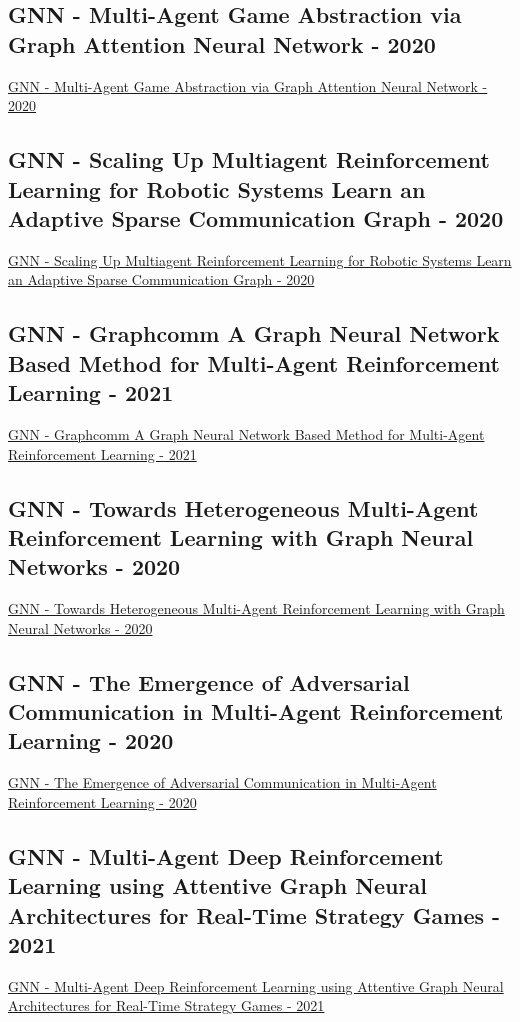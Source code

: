 \subsection{GNN - Multi-Agent Game Abstraction via Graph Attention Neural Network  - 2020}
\href{https://ojs.aaai.org/index.php/AAAI/article/view/6211}{GNN - Multi-Agent Game Abstraction via Graph Attention Neural Network  - 2020}

\subsection{GNN - Scaling Up Multiagent Reinforcement Learning for Robotic Systems Learn an Adaptive Sparse Communication Graph - 2020}
\href{https://arxiv.org/abs/2003.01040}{GNN - Scaling Up Multiagent Reinforcement Learning for Robotic Systems Learn an Adaptive Sparse Communication Graph - 2020}

\subsection{GNN - Graphcomm A Graph Neural Network Based Method for Multi-Agent Reinforcement Learning - 2021}
\href{https://ieeexplore.ieee.org/abstract/document/9413716}{GNN - Graphcomm A Graph Neural Network Based Method for Multi-Agent Reinforcement Learning - 2021}

\subsection{GNN - Towards Heterogeneous Multi-Agent Reinforcement Learning with Graph Neural Networks - 2020}
\href{https://arxiv.org/abs/2009.13161}{GNN - Towards Heterogeneous Multi-Agent Reinforcement Learning with Graph Neural Networks - 2020}

\subsection{GNN - The Emergence of Adversarial Communication in Multi-Agent Reinforcement Learning - 2020}
\href{https://arxiv.org/abs/2008.02616}{GNN - The Emergence of Adversarial Communication in Multi-Agent Reinforcement Learning - 2020}

\subsection{GNN - Multi-Agent Deep Reinforcement Learning using Attentive Graph Neural Architectures for Real-Time Strategy Games - 2021}
\href{https://arxiv.org/abs/2105.10211}{GNN - Multi-Agent Deep Reinforcement Learning using Attentive Graph Neural Architectures for Real-Time Strategy Games - 2021}


